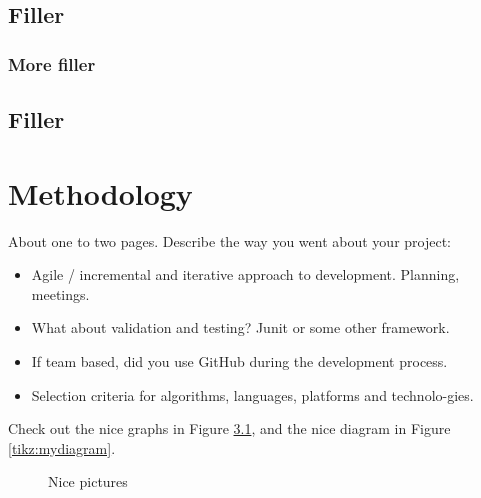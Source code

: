 \section{Filler}


\subsection{More filler}

\section{Filler}


\chapter{Methodology}
About one to two pages.
Describe the way you went about your project:
\begin{itemize}
\item Agile / incremental and iterative approach to development. Planning, meetings.
\item What about validation and testing? Junit or some other framework.
\item If team based, did you use GitHub during the development process.
\item Selection criteria for algorithms, languages, platforms and technolo-gies.
\end{itemize}
Check out the nice graphs in Figure \ref{tikz:graphs}, and the nice diagram in Figure \ref{tikz:mydiagram}.

\begin{figure}
  \centering
  \hspace{1.5cm}
  \caption{Nice pictures}
  \label{tikz:graphs}
\end{figure}


